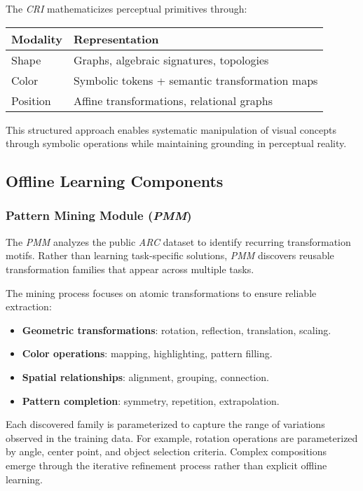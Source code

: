 \documentclass[12pt]{article}
\newcommand{\arc}{\textit{ARC}}
\newcommand{\pmm}{\textit{PMM}}
\newcommand{\cri}{\textit{CRI}}
\begin{document}
The \cri{} mathematicizes perceptual primitives through:

\begin{center}
\begin{tabular}{|l|l|}
\hline
\textbf{Modality} & \textbf{Representation} \\
\hline
Shape & Graphs, algebraic signatures, topologies \\
Color & Symbolic tokens + semantic transformation maps \\
Position & Affine transformations, relational graphs \\
\hline
\end{tabular}
\end{center}

This structured approach enables systematic manipulation of visual concepts through symbolic operations while maintaining grounding in perceptual reality.

\subsection{Offline Learning Components}

\subsubsection{Pattern Mining Module (\pmm{})}

The \pmm{} analyzes the public \arc{} dataset to identify recurring transformation motifs. Rather than learning task-specific solutions, \pmm{} discovers reusable transformation families that appear across multiple tasks.

The mining process focuses on atomic transformations to ensure reliable extraction:
\begin{itemize}[noitemsep,topsep=0pt]
\item\textbf{Geometric transformations}: rotation, reflection, translation, scaling.
\item\textbf{Color operations}: mapping, highlighting, pattern filling.
\item\textbf{Spatial relationships}: alignment, grouping, connection.
\item\textbf{Pattern completion}: symmetry, repetition, extrapolation.
\end{itemize}

Each discovered family is parameterized to capture the range of variations observed in the training data. For example, rotation operations are parameterized by angle, center point, and object selection criteria. Complex compositions emerge through the iterative refinement process rather than explicit offline learning.
\end{document}
